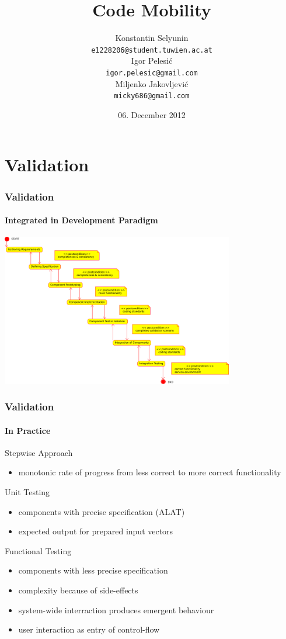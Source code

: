\documentclass{beamer}
\title[Code Mobility]{Code Mobility}
\date{06. December 2012}
\author[Selyunin,Pelesi\'c,Jakovljevi\'c]{
 \Large{Konstantin Selyunin}\\
  \small{\texttt{e1228206@student.tuwien.ac.at}}\\
 \Large{Igor Pelesi\'c}\\
  \small{\texttt{igor.pelesic@gmail.com}}\\
 \Large{Miljenko Jakovljevi\'c}\\
  \small{\texttt{micky686@gmail.com}}\\
}
\theoremstyle{definition} \newtheorem{mdefinition}{Definition}
\theoremstyle{plain} \newtheorem{mtheorem}{Theorem}
\theoremstyle{plain} \newtheorem{mcorollary}{Corollary}
\theoremstyle{plain} \newtheorem{mfact}{Fact}
\begin{document}
\section{Validation}

\begin{frame}
  \frametitle{Validation}
   \framesubtitle{Integrated in Development Paradigm}
  \includegraphics[width=4in]{img/stepwise_validation_process.png}
\end{frame}

\begin{frame}
  \frametitle{Validation}
  \framesubtitle{In Practice}
  \begin{description}
  \item Stepwise Approach
    \begin{itemize}     
      \item monotonic rate of progress from less correct to more correct functionality 
    \end{itemize}
  \item Unit Testing 
    \begin{itemize}     
     \item components with precise specification (ALAT)
     \item expected output for prepared input vectors
    \end{itemize}
  \item Functional Testing
    \begin{itemize}     
     \item components with less precise specification
      \item complexity because of side-effects 
      \item system-wide interraction produces emergent behaviour
      \item user interaction as entry of control-flow 
    \end{itemize}
  \end{description}
\end{frame}
\end{document}
